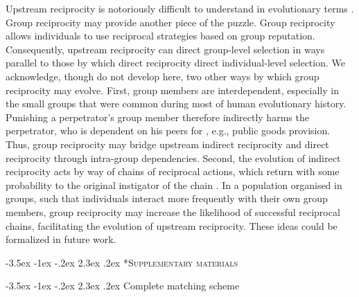 \documentclass[12pt,a4paper]{article}\usepackage[]{graphicx}\usepackage[]{color}
\makeatletter
\renewcommand\section{\@startsection {section}{1}{\z@}%
{-3.5ex \@plus -1ex \@minus -.2ex}%
{2.3ex \@plus.2ex}%
{\bf\sffamily\Large}}
\makeatother
\begin{document}
Upstream reciprocity is notoriously difficult to understand in evolutionary
terms \citep{boyd1989evolution,nowak2007upstream}. Group reciprocity may provide another piece of 
the puzzle. Group reciprocity allows individuals to use reciprocal strategies based on group 
reputation. Consequently, upstream reciprocity can direct group-level selection in ways parallel 
to those by which direct reciprocity direct individual-level selection.
We acknowledge, though do not develop here, two other ways by which group reciprocity may evolve.
First, group members are interdependent, especially in the small groups that were common during most of human evolutionary 
history. Punishing a perpetrator's group member therefore indirectly harms the perpetrator, who is dependent on his peers for
, e.g., public goods provision. Thus, group reciprocity may bridge upstream indirect reciprocity and direct reciprocity 
through intra-group dependencies. Second, the evolution of indirect reciprocity acts by way of chains
of reciprocal actions, which return with some probability to the original
instigator of the chain \citep{nowak2007upstream}. In a population
organised in groups, such that individuals interact more frequently with
their own group members, group reciprocity may increase the likelihood
of successful reciprocal chains, facilitating the evolution of upstream
reciprocity. These ideas could be formalized in future work.



\newpage
\printbibliography
%
%

\newpage

\section*{\textsc{Supplementary materials}}

\setcounter{figure}{0}
\setcounter{section}{0}
\renewcommand\thesection{Appendix~\Alph{section}:}
\renewcommand\thefigure{\Alph{section}.\arabic{figure}}  

\section{Complete matching scheme}
\begin{center}
\begin{sideways}\resizebox{0.9\textheight}{!}{



}
\end{sideways}
\end{center}
\end{document}
